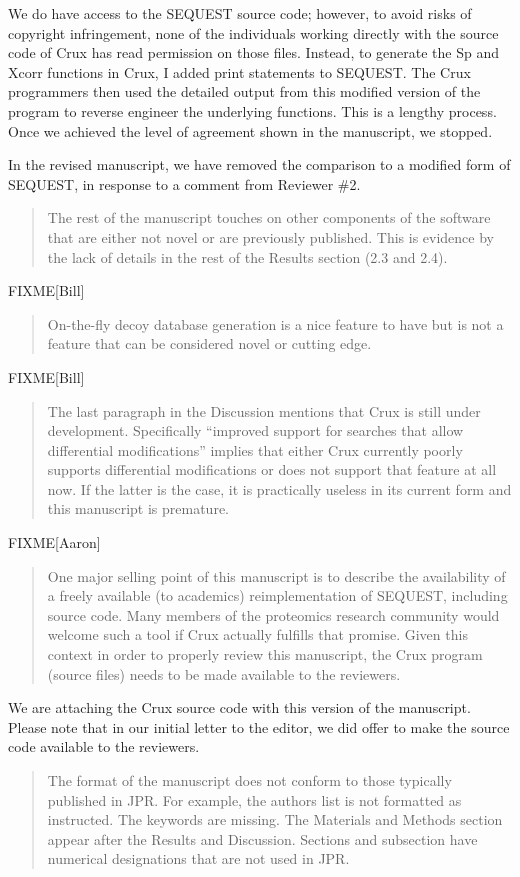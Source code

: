 \documentclass{article}
\newcommand{\breview}{\begin{quotation}\begin{em}\noindent}
\newcommand{\ereview}{\end{em}\end{quotation}}
\begin{document}
We do have access to the SEQUEST source code; however, to avoid risks
of copyright infringement, none of the individuals working directly
with the source code of Crux has read permission on those files.
Instead, to generate the Sp and Xcorr functions in Crux, I added print
statements to SEQUEST.  The Crux programmers then used the detailed
output from this modified version of the program to reverse engineer
the underlying functions.  This is a lengthy process.  Once we
achieved the level of agreement shown in the manuscript, we stopped.

In the revised manuscript, we have removed the comparison to a
modified form of SEQUEST, in response to a comment from Reviewer \#2.

\breview The rest of the manuscript touches on other components of the
software that are either not novel or are previously published.  This
is evidence by the lack of details in the rest of the Results section
(2.3 and 2.4).  \ereview

FIXME[Bill]

\breview On-the-fly decoy database generation is a nice feature to
have but is not a feature that can be considered novel or cutting
edge. \ereview

FIXME[Bill]

\breview The last paragraph in the Discussion mentions that Crux is
still under development.  Specifically ``improved support for searches
that allow differential modifications'' implies that either Crux
currently poorly supports differential modifications or does not
support that feature at all now.  If the latter is the case, it is
practically useless in its current form and this manuscript is
premature. \ereview

FIXME[Aaron]

\breview One major selling point of this manuscript is to describe the
availability of a freely available (to academics) reimplementation of
SEQUEST, including source code.  Many members of the proteomics
research community would welcome such a tool if Crux actually fulfills
that promise.  Given this context in order to properly review this
manuscript, the Crux program (source files) needs to be made available
to the reviewers. \ereview

We are attaching the Crux source code with this version of the
manuscript.  Please note that in our initial letter to the editor, we
did offer to make the source code available to the reviewers.

\breview The format of the manuscript does not conform to those
typically published in JPR.  For example, the authors list is not
formatted as instructed.  The keywords are missing.  The Materials and
Methods section appear after the Results and Discussion.  Sections and
subsection have numerical designations that are not used in
JPR. \ereview
\end{document}
